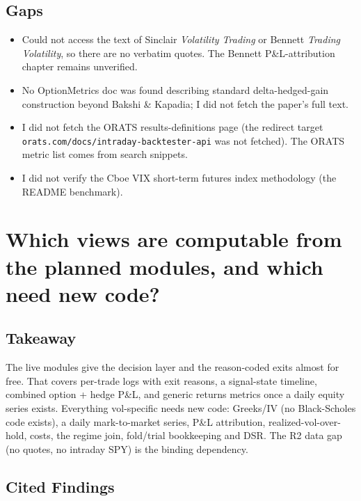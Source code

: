 \documentclass{article}
\begin{document}
\subsection{Gaps}

\begin{itemize}

\item Could not access the text of Sinclair \emph{Volatility Trading} or Bennett \emph{Trading Volatility}, so there are no verbatim quotes. The Bennett P\&L-attribution chapter remains unverified.

\item No OptionMetrics doc was found describing standard delta-hedged-gain construction beyond Bakshi \& Kapadia; I did not fetch the paper's full text.

\item I did not fetch the ORATS results-definitions page (the redirect target \texttt{orats.\allowbreak{}com/\allowbreak{}docs/\allowbreak{}intraday-\allowbreak{}backtester-\allowbreak{}api} was not fetched). The ORATS metric list comes from search snippets.

\item I did not verify the Cboe VIX short-term futures index methodology (the README benchmark).

\end{itemize}

\section{Which views are computable from the planned modules, and which need new code?}

\subsection{Takeaway}

The live modules give the decision layer and the reason-coded exits almost for free. That covers per-trade logs with exit reasons, a signal-state timeline, combined option + hedge P\&L, and generic returns metrics once a daily equity series exists. Everything vol-specific needs new code: Greeks/\allowbreak{}IV (no Black-Scholes code exists), a daily mark-to-market series, P\&L attribution, realized-vol-over-hold, costs, the regime join, fold/\allowbreak{}trial bookkeeping and DSR. The R2 data gap (no quotes, no intraday SPY) is the binding dependency.

\subsection{Cited Findings}
\end{document}
